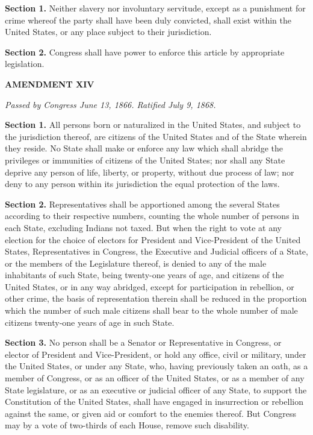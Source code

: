 \textbf{Section 1.}
Neither slavery nor involuntary servitude, except as a punishment for crime whereof the party shall have been duly convicted, shall exist within the United States, or any place subject to their jurisdiction.

\textbf{Section 2.}
Congress shall have power to enforce this article by appropriate legislation.

\begin{center} 
\textbf{AMENDMENT XIV}
\end{center} 

\textit{Passed by Congress June 13, 1866. Ratified July 9, 1868.}

\textbf{Section 1.}
All persons born or naturalized in the United States, and subject to the jurisdiction thereof, are citizens of the United States and of the State wherein they reside. No State shall make or enforce any law which shall abridge the privileges or immunities of citizens of the United States; nor shall any State deprive any person of life, liberty, or property, without due process of law; nor deny to any person within its jurisdiction the equal protection of the laws.

\textbf{Section 2.}
Representatives shall be apportioned among the several States according to their respective numbers, counting the whole number of persons in each State, excluding Indians not taxed. But when the right to vote at any election for the choice of electors for President and Vice-President of the United States, Representatives in Congress, the Executive and Judicial officers of a State, or the members of the Legislature thereof, is denied to any of the male inhabitants of such State, being twenty-one years of age, and citizens of the United States, or in any way abridged, except for participation in rebellion, or other crime, the basis of representation therein shall be reduced in the proportion which the number of such male citizens shall bear to the whole number of male citizens twenty-one years of age in such State.

\textbf{Section 3.}
No person shall be a Senator or Representative in Congress, or elector of President and Vice-President, or hold any office, civil or military, under the United States, or under any State, who, having previously taken an oath, as a member of Congress, or as an officer of the United States, or as a member of any State legislature, or as an executive or judicial officer of any State, to support the Constitution of the United States, shall have engaged in insurrection or rebellion against the same, or given aid or comfort to the enemies thereof. But Congress may by a vote of two-thirds of each House, remove such disability.


